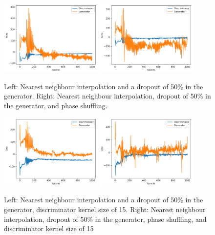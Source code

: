 \begin{figure}[t]
\centering
\includegraphics[width=0.45\textwidth]{loss_plots/wpgan_flute_hist_nearest_k5_d50_0803.png}
\includegraphics[width=0.45\textwidth]{loss_plots/wpgan_flute_hist_nearest_ps_k5_d50_0803.png}
\caption{Left: Nearest neighbour interpolation and a dropout of 50\% in the generator. Right: Nearest neighbour interpolation, dropout of 50\% in the generator, and phase shuffling.}
\end{figure}

\begin{figure}[t]
\centering
\includegraphics[width=0.45\textwidth]{loss_plots/wpgan_flute_hist_nearest_k15_d50_0803.png}
\includegraphics[width=0.45\textwidth]{loss_plots/wpgan_flute_hist_nearest_ps_k15_d50_0803.png}
\caption{Left: Nearest neighbour interpolation and a dropout of 50\% in the generator, discriminator kernel size of 15. Right: Nearest neighbour interpolation, dropout of 50\% in the generator, phase shuffling, and discriminator kernel size of 15}
\end{figure}

